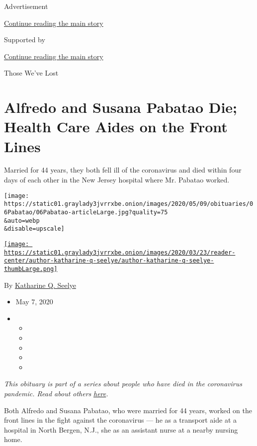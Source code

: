 Advertisement

\protect\hyperlink{after-top}{Continue reading the main story}

Supported by

\protect\hyperlink{after-sponsor}{Continue reading the main story}

Those We've Lost

\hypertarget{alfredo-and-susana-pabatao-die-health-care-aides-on-the-front-lines}{%
\section{Alfredo and Susana Pabatao Die; Health Care Aides on the Front
Lines}\label{alfredo-and-susana-pabatao-die-health-care-aides-on-the-front-lines}}

Married for 44 years, they both fell ill of the coronavirus and died
within four days of each other in the New Jersey hospital where Mr.
Pabatao worked.

\texttt{[image: https://static01.graylady3jvrrxbe.onion/images/2020/05/09/obituaries/06Pabatao/06Pabatao-articleLarge.jpg?quality=75\\\&auto=webp\\\&disable=upscale]}

\href{https://www.nytimes3xbfgragh.onion/by/katharine-q-seelye}{\texttt{[image: https://static01.graylady3jvrrxbe.onion/images/2020/03/23/reader-center/author-katharine-q-seelye/author-katharine-q-seelye-thumbLarge.png]}}

By
\href{https://www.nytimes3xbfgragh.onion/by/katharine-q-seelye}{Katharine
Q. Seelye}

\begin{itemize}
\item
  May 7, 2020
\item
  \begin{itemize}
  \item
  \item
  \item
  \item
  \item
  \end{itemize}
\end{itemize}

\emph{This obituary is part of a series about people who have died in
the coronavirus pandemic. Read about others}
\href{https://www.nytimes3xbfgragh.onion/series/people-who-have-died-of-the-coronavirus}{\emph{here}}\emph{.}

Both Alfredo and Susana Pabatao, who were married for 44 years, worked
on the front lines in the fight against the coronavirus --- he as a
transport aide at a hospital in North Bergen, N.J., she as an assistant
nurse at a nearby nursing home.

